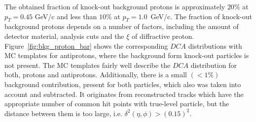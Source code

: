  The obtained fraction of knock-out background protons is approximately $20\%$ at $p_T = 0.45$ GeV/c
 and less than $10\%$ at $p_T = 1.0$~GeV/c. The fraction of knock-out background protons depends on a number of factors, including the amount of detector material, analysis cuts and the $\xi$ of diffractive proton. 
 Figure~\ref{fig:bkg_proton_bar} shows the corresponding $DCA$ distributions with MC templates for antiprotons, where the background form knock-out particles is not present. The MC templates  fairly well describe the $DCA$ distribution for both, protons and antiprotons. Additionally, there is a small $\left(<1\%\right)$ background  contribution, present for both particles, which also was taken into account and subtracted. It originates from reconstructed tracks which have the appropriate number of common hit points with true-level particle, but the distance between them is too large, i.e. $\delta^2\left(\eta,\phi\right)>\left(0.15\right)^2$.
 \captionsetup{format=default,indention=0pt,justification=justified}
 \FloatBarrier